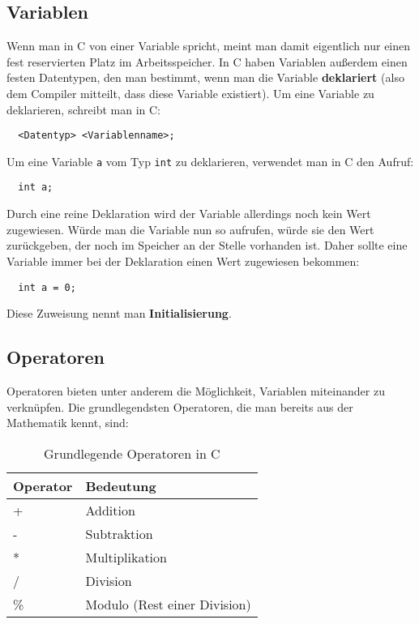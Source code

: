 \documentclass[11pt]{article}
\begin{document}
\subsection{Variablen}
Wenn man in C von einer Variable spricht, meint man damit eigentlich nur einen fest reservierten Platz im Arbeitsspeicher.
In C haben Variablen außerdem einen festen Datentypen, den man bestimmt, wenn man die Variable \textbf{deklariert} (also dem Compiler
mitteilt, dass diese Variable existiert). Um eine Variable zu deklarieren, schreibt man in C:
\begin{verbatim}
  <Datentyp> <Variablenname>;
\end{verbatim}

\begin{bsp}
  Um eine Variable \texttt{a} vom Typ \texttt{int} zu deklarieren, verwendet man in C den Aufruf:
  \begin{verbatim}
  int a;
  \end{verbatim}
\end{bsp}

Durch eine reine Deklaration wird der Variable allerdings noch kein Wert zugewiesen. Würde man die Variable nun so aufrufen,
würde sie den Wert zurückgeben, der noch im Speicher an der Stelle vorhanden ist. Daher sollte eine Variable immer
bei der Deklaration einen Wert zugewiesen bekommen:
\begin{verbatim}
  int a = 0;
\end{verbatim}

Diese Zuweisung nennt man \textbf{Initialisierung}.

\subsection{Operatoren}
Operatoren bieten unter anderem die Möglichkeit, Variablen miteinander zu verknüpfen. Die grundlegendsten Operatoren, die
man bereits aus der Mathematik kennt, sind:
\begin{table}[h!]
  \centering
  \begin{tabular}{@{}ll@{}}
    \toprule
    Operator & Bedeutung                    \\ \midrule
    +        & Addition                     \\
    -        & Subtraktion                  \\
    *        & Multiplikation               \\
    /        & Division                     \\
    \%       & Modulo (Rest einer Division) \\ \bottomrule
  \end{tabular}
  \caption{Grundlegende Operatoren in C}
\end{table}
\end{document}
